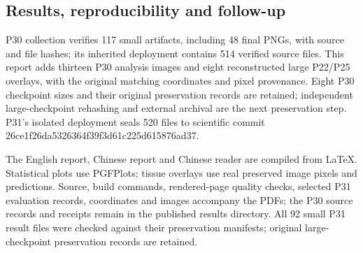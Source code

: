 \documentclass[
  11pt,
]{article}
\begin{document}
\subsection{Results, reproducibility and
follow-up}\label{results-reproducibility-and-follow-up}

P30 collection verifies 117 small artifacts, including 48 final PNGs,
with source and file hashes; its inherited deployment contains 514
verified source files. This report adds thirteen P30 analysis images and
eight reconstructed large P22/P25 overlays, with the original matching
coordinates and pixel provenance. Eight P30 checkpoint sizes and their
original preservation records are retained; independent large-checkpoint
rehashing and external archival are the next preservation step. P31's
isolated deployment seals 520 files to scientific commit
26ce1f26da5326364f39f3d61c225d615876ad37.

The English report, Chinese report and Chinese reader are compiled from
LaTeX. Statistical plots use PGFPlots; tissue overlays use real
preserved image pixels and predictions. Source, build commands,
rendered-page quality checks, selected P31 evaluation records,
coordinates and images accompany the PDFs; the P30 source records and
receipts remain in the published results directory. All 92 small P31
result files were checked against their preservation manifests; original
large-checkpoint preservation records are retained.
\end{document}
